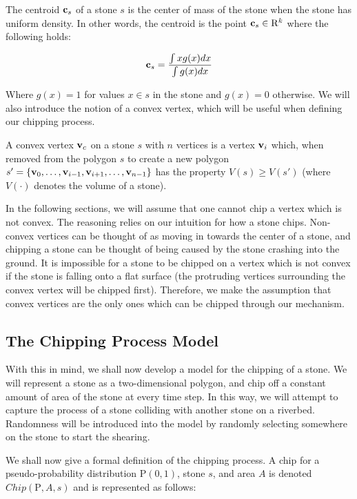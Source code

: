 The centroid $\mathbf{c}_s$ of a stone $s$ is the center of mass of the stone when the stone has uniform density. In other words, the centroid is the point $\mathbf{c}_s \in \mathrm{R}^k$ where the following holds:

\begin{eqnarray}
  \mathbf{c}_s = \frac{\int x g(x) dx}{\int g(x) dx}
\end{eqnarray}

Where $g(x) = 1$ for values $x \in s$ in the stone and $g(x) = 0$ otherwise. We will also introduce the notion of a convex vertex, which will be useful when defining our chipping process.

\begin{definition}
  A convex vertex $\mathbf{v}_c$ on a stone $s$ with $n$ vertices is a vertex $\mathbf{v}_i$ which, when removed from the polygon $s$ to create a new polygon $s' = \{ \mathbf{v}_0, \ldots, \mathbf{v}_{i-1}, \mathbf{v}_{i+1}, \ldots, \mathbf{v}_{n-1} \}$ has the property $V(s) \geq V(s')$ (where $V(\cdot)$ denotes the volume of a stone).
\end{definition}

In the following sections, we will assume that one cannot chip a vertex which is not convex. The reasoning relies on our intuition for how a stone chips. Non-convex vertices can be thought of as moving in towards the center of a stone, and chipping a stone can be thought of being caused by the stone crashing into the ground. It is impossible for a stone to be chipped on a vertex which is not convex if the stone is falling onto a flat surface (the protruding vertices surrounding the convex vertex will be chipped first). Therefore, we make the assumption that convex vertices are the only ones which can be chipped through our mechanism.

\subsection{The Chipping Process Model}

With this in mind, we shall now develop a model for the chipping of a stone. We will represent a stone as a two-dimensional polygon, and chip off a constant amount of area of the stone at every time step. In this way, we will attempt to capture the process of a stone colliding with another stone on a riverbed. Randomness will be introduced into the model by randomly selecting somewhere on the stone to start the shearing.

We shall now give a formal definition of the chipping process. A chip for a pseudo-probability distribution $\mathrm{P}(0,1)$, stone $s$, and area $A$ is denoted $Chip(\mathrm{P}, A, s)$ and is represented as follows:

